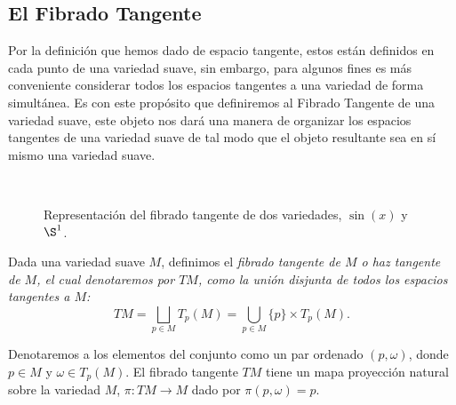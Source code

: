 \subsection{El Fibrado Tangente}\label{Subsección: Fibrado Tangente}
Por la definición que hemos dado de espacio tangente, estos están definidos en cada punto de una variedad suave, sin embargo, para algunos fines es más conveniente considerar todos los espacios tangentes a una variedad de forma simultánea. Es con este propósito que definiremos al Fibrado Tangente de una variedad suave, este objeto nos dará una manera de organizar los espacios tangentes de una variedad suave de tal modo que el objeto resultante sea en sí mismo una variedad suave.

\begin{center}
	\begin{figure}[h!]
		\centering
		\begin{subfigure}{0.35\textwidth}
			\centering
			
		\end{subfigure}
		\hspace{40pt}
		\begin{subfigure}{0.35\textwidth}
			\centering
			
		\end{subfigure}
		\\[20pt]
		\begin{subfigure}{0.35\textwidth}
			\centering
			
		\end{subfigure}
		\hspace{30pt}
		\begin{subfigure}{0.35\textwidth}
			\centering
			
		\end{subfigure}
		\caption{Representación del fibrado tangente de dos variedades, $\sin(x)$ y $\S^{1}$.}
	\end{figure}
\end{center}

\begin{definition}
	Dada una variedad suave $M$, definimos el \it{fibrado tangente de $M$} o \it{haz tangente de $M$}, el cual denotaremos por $TM$, como la unión disjunta de todos los espacios tangentes a $M$:
	\[ TM = \bigsqcup_{p \in M} T_p(M) = \bigcup_{p \in M} \{p\} \times T_p(M). \]
\end{definition}

Denotaremos a los elementos del conjunto como un par ordenado $(p, \omega)$, donde $p \in M$ y $\omega \in T_p(M)$. El fibrado tangente $TM$ tiene un mapa proyección natural sobre la variedad $M$, $\pi: TM \to M$ dado por $\pi(p,\omega)=p$.

